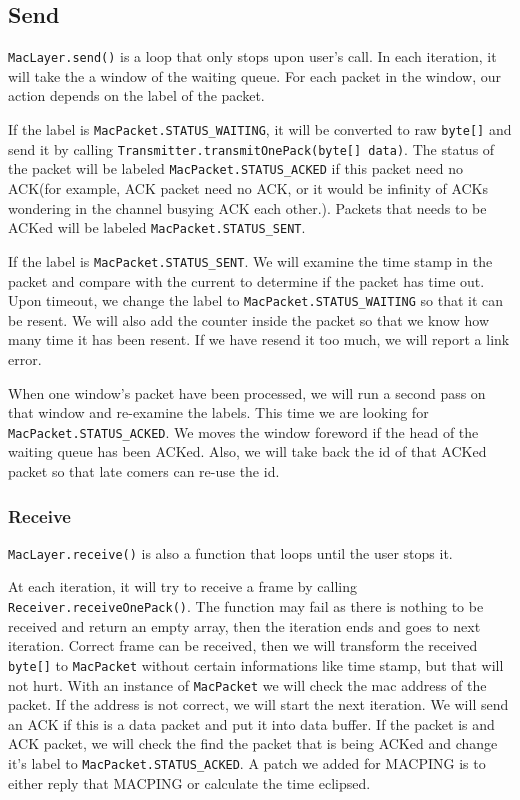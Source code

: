 \documentclass[conference,compsoc]{IEEEtran}
\begin{document}
	\subsection{Send}
		\lstinline{MacLayer.send()} is a loop that only stops upon user's call.
		In each iteration, it will take the a window of the waiting queue. 
		For each packet in the window, our action depends on the label of the packet.
		\par
		If the label is \lstinline{MacPacket.STATUS_WAITING}, it will be converted to raw \lstinline{byte[]} and send it by calling \lstinline{Transmitter.transmitOnePack(byte[] data)}. 
		The status of the packet will be labeled \lstinline{MacPacket.STATUS_ACKED} if this packet need no ACK(for example, ACK packet need no ACK, or it would be infinity of ACKs wondering in the channel busying ACK each other.). 
		Packets that needs to be ACKed will be labeled \lstinline{MacPacket.STATUS_SENT}.
		\par 
		If the label is \lstinline{MacPacket.STATUS_SENT}. 
		We will examine the time stamp in the packet and compare with the current to determine if the packet has time out. Upon timeout, we change the label to \lstinline{MacPacket.STATUS_WAITING} so that it can be resent. 
		We will also add the counter inside the packet so that we know how many time it has been resent. 
		If we have resend it too much, we will report a link error.
		\par
		When one window's packet have been processed, we will run a second pass on that window and re-examine the labels. 
		This time we are looking for \lstinline{MacPacket.STATUS_ACKED}. 
		We moves the window foreword if the head of the waiting queue has been ACKed. 
		Also, we will take back the id of that ACKed packet so that late comers can re-use the id.

	\subsubsection{Receive}
		\lstinline{MacLayer.receive()} is also a function that loops until the user stops it.
		\par
		At each iteration, it will try to receive a frame by calling \lstinline{Receiver.receiveOnePack()}.
		The function may fail as there is nothing to be received and return an empty array, then the iteration ends and goes to next iteration.
		Correct frame can be received, then we will transform the received \lstinline{byte[]} to \lstinline{MacPacket} without certain informations like time stamp, but that will not hurt.
		With an instance of \lstinline{MacPacket} we will check the mac address of the packet. 
		If the address is not correct, we will start the next iteration. 
		We will send an ACK if this is a data packet and put it into data buffer. 
		If the packet is and ACK packet, we will check the find the packet that is being ACKed and change it's label to \lstinline{MacPacket.STATUS_ACKED}.
		A patch we added for MACPING is to either reply that MACPING or calculate the time eclipsed.
\end{document}
